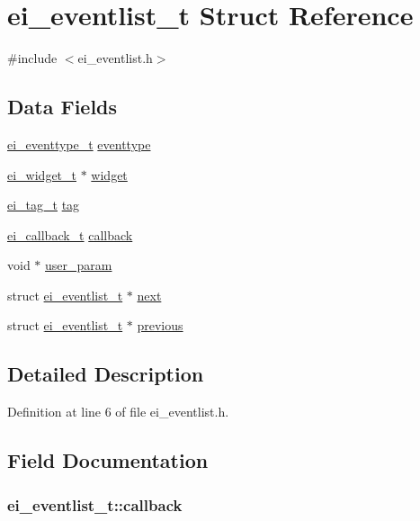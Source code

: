 \hypertarget{structei__eventlist__t}{\section{ei\+\_\+eventlist\+\_\+t Struct Reference}
\label{structei__eventlist__t}
}


{\ttfamily \#include $<$ei\+\_\+eventlist.\+h$>$}

\subsection*{Data Fields}
\begin{DoxyCompactItemize}
\item 
\hyperlink{ei__event_8h_a132dde064150d861ad24e9d839cbe007}{ei\+\_\+eventtype\+\_\+t} \hyperlink{structei__eventlist__t_a0a2abf95b8cb56efa45ef9bcb521132b}{eventtype}
\item 
\hyperlink{structei__widget__t}{ei\+\_\+widget\+\_\+t} $\ast$ \hyperlink{structei__eventlist__t_a9842e40b69204e5456167184ca03770d}{widget}
\item 
\hyperlink{ei__event_8h_a24a8242260cfd8ddb6ef915f3de5a10f}{ei\+\_\+tag\+\_\+t} \hyperlink{structei__eventlist__t_a8827122ccd2ab2def51be82dc3e75aad}{tag}
\item 
\hyperlink{ei__widget_8h_a3692fee0affca071917f22f2ec2018a4}{ei\+\_\+callback\+\_\+t} \hyperlink{structei__eventlist__t_a76dcc1d953291651fdafbd4dbb8c736e}{callback}
\item 
void $\ast$ \hyperlink{structei__eventlist__t_aa0a5cff6ec4391c1a2c24bfd02323479}{user\+\_\+param}
\item 
struct \hyperlink{structei__eventlist__t}{ei\+\_\+eventlist\+\_\+t} $\ast$ \hyperlink{structei__eventlist__t_a4672ce57c73628dd5ecb645691e0ff26}{next}
\item 
struct \hyperlink{structei__eventlist__t}{ei\+\_\+eventlist\+\_\+t} $\ast$ \hyperlink{structei__eventlist__t_ad114c93968018e8fce16f0a32da105aa}{previous}
\end{DoxyCompactItemize}


\subsection{Detailed Description}


Definition at line 6 of file ei\+\_\+eventlist.\+h.



\subsection{Field Documentation}
\hypertarget{structei__eventlist__t_a76dcc1d953291651fdafbd4dbb8c736e}{
\subsubsection[{callback}]{ ei\+\_\+eventlist\+\_\+t\+::callback}}\label{structei__eventlist__t_a76dcc1d953291651fdafbd4dbb8c736e}


